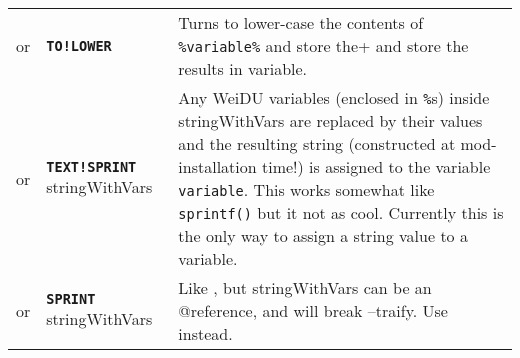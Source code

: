 \documentclass{article}
\def\ttref#1{\ahrefloc{#1}{\tt #1}}
\def\DEFINE#1{{\tt \bf #1}\label{#1}\index{#1}}
\def\t#1{{\tt #1}}
\begin{document}
\begin{tabular}{cp{10in}|p{10in}}
or & \DEFINE{TO!LOWER} \ttref{variable} &
  Turns to lower-case the contents of \verb+%variable%+ and store the
  results in variable. \\
or & \DEFINE{TEXT!SPRINT} \ttref{variable} stringWithVars &
  Any WeiDU variables (enclosed in \t{\%}s) inside stringWithVars are
  replaced by their values and the resulting string (constructed at
  mod-installation time!) is assigned to the variable \t{variable}.
  This works somewhat like \t{sprintf()} but it not as cool. Currently this
  is the only way to assign a string value to a variable. \\
or & \DEFINE{SPRINT} \ttref{variable} stringWithVars &
  Like \ttref{TEXT!SPRINT}, but stringWithVars can be an @reference, and will
  break --traify. Use \ttref{TEXT!SPRINT} instead. \\


\end{tabular}
\end{document}
